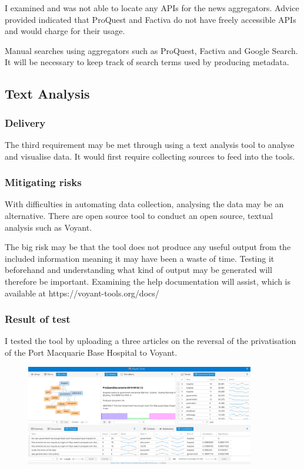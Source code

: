 \documentclass{article}
\begin{document}
I examined and was not able to locate any APIs for the news aggregators. Advice provided indicated that ProQuest and Factiva do not have freely accessible APIs and would charge for their usage.

Manual searches using aggregators such as ProQuest, Factiva and Google Search. It will be necessary to keep track of search terms used by producing metadata.

\subsection*{Text Analysis}
\subsubsection*{Delivery}

The third requirement may be met through using a text analysis tool to analyse and visualise data. It would first require collecting sources to feed into the tools.\par  

\subsubsection*{Mitigating risks}

With difficulties in automating data collection, analysing the data may be an alternative. There are open source tool to conduct an open source, textual analysis such as Voyant.

The big risk may be that the tool does not produce any useful output from the included information meaning it may have been a waste of time. Testing it beforehand and understanding what kind of output may be generated will therefore be important. Examining the help documentation will assist, which is available at https://voyant-tools.org/docs/\par

\subsubsection*{Result of test}

I tested the tool by uploading a three articles on the reversal of the privatisation of the Port Macquarie Base Hospital to Voyant.

\begin{figure}[htp]
    \centering
    \includegraphics[width=10cm]{Voyant.png}
    \label{fig:voyant}
\end{figure}
\end{document}
